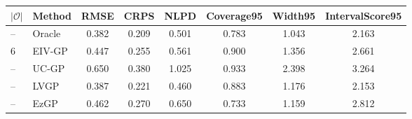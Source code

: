 
\begin{tabular}{llcccccc}
\toprule
$|\mathcal O|$ & Method & RMSE & CRPS & NLPD & Coverage95 & Width95 & IntervalScore95\\
\midrule
-- & Oracle & 0.382 & 0.209 & 0.501 & 0.783 & 1.043 & 2.163\\
6 & EIV-GP & 0.447 & 0.255 & 0.561 & 0.900 & 1.356 & 2.661\\
-- & UC-GP & 0.650 & 0.380 & 1.025 & 0.933 & 2.398 & 3.264\\
-- & LVGP & 0.387 & 0.221 & 0.460 & 0.883 & 1.176 & 2.153\\
-- & EzGP & 0.462 & 0.270 & 0.650 & 0.733 & 1.159 & 2.812\\
\bottomrule
\end{tabular}
